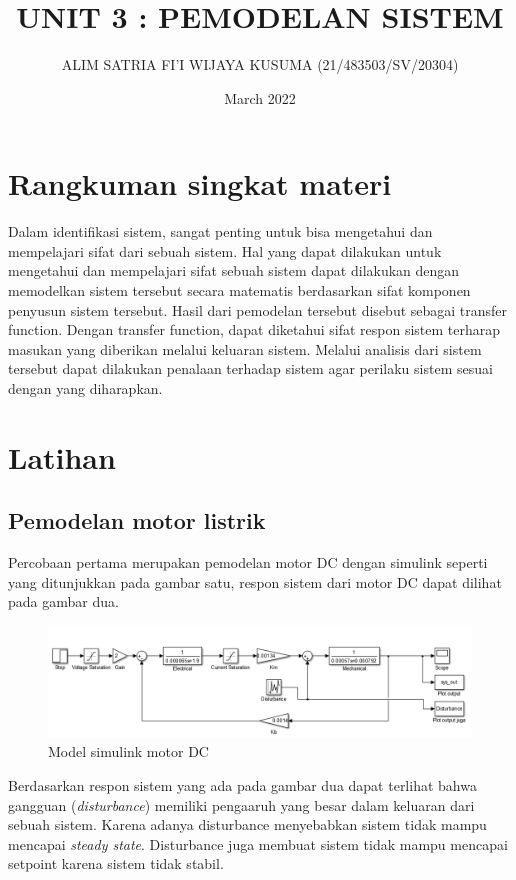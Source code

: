 \documentclass[12pt]{journal}
\title{UNIT 3 : PEMODELAN SISTEM}
\author{ALIM SATRIA FI'I WIJAYA KUSUMA (21/483503/SV/20304)}
\date{March 2022}
\begin{document}
\maketitle

\section{Rangkuman singkat materi}

Dalam identifikasi sistem, sangat penting untuk bisa mengetahui dan mempelajari sifat dari sebuah sistem. Hal yang dapat dilakukan untuk mengetahui dan mempelajari sifat sebuah sistem dapat dilakukan dengan memodelkan sistem tersebut secara matematis berdasarkan sifat komponen penyusun sistem tersebut. Hasil dari pemodelan tersebut disebut sebagai transfer function. Dengan transfer function, dapat diketahui sifat respon sistem terharap masukan yang diberikan melalui keluaran sistem. Melalui analisis dari sistem tersebut dapat dilakukan penalaan terhadap sistem agar perilaku sistem sesuai dengan yang diharapkan.

\section{Latihan}

\subsection{Pemodelan motor listrik}

Percobaan pertama merupakan pemodelan motor DC dengan simulink seperti yang ditunjukkan pada gambar satu, respon sistem dari motor DC dapat dilihat pada gambar dua.

\begin{figure}[H]
    \centering
    \includegraphics[width=\textwidth]{soal_nomor_1.png}
    \caption{Model simulink motor DC}
    \label{simulink_motor_DC}
\end{figure}

Berdasarkan respon sistem yang ada pada gambar dua dapat terlihat bahwa gangguan (\textit{disturbance}) memiliki pengaaruh yang besar dalam keluaran dari sebuah sistem. Karena adanya disturbance menyebabkan sistem tidak mampu mencapai \textit{steady state}. Disturbance juga membuat sistem tidak mampu mencapai setpoint karena sistem tidak stabil.
\end{document}
